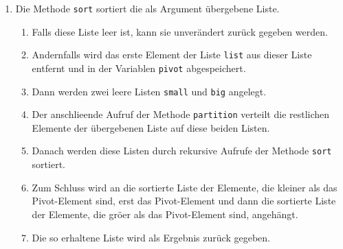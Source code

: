 \begin{enumerate}
      Falls die Listen \texttt{small} und \texttt{big} bei dem Aufruf nicht leer sind,
      so ist die Idee, dass die Elemente aus \texttt{list} entsprechend ihrer Gr\"o\3e
      den beiden Listen \texttt{small} und \texttt{big} hinzugef\"ugt werden.
      \begin{enumerate}
      \item Falls \texttt{list} leer ist, so gibt es keine Elemente, die verteilt werden
            m\"ussen.
      \item Andernfalls wird das erste Element von \texttt{list} aus \texttt{list}
            entfernt und, je nach dem wie gro\3 es im Vergleich zu dem Pivot-Element
            \texttt{pivot} ist, in die Liste \texttt{small} oder \texttt{big} eingef\"ugt.
      \item Schlie\3lich werden die restlichen Elemente von \texttt{list} durch einen
            rekursiven Aufruf der Funktion \texttt{partition} auf die Listen \texttt{small}
            und \texttt{big} verteilt.
      \end{enumerate}
\item Die Methode \texttt{sort} sortiert die als Argument \"ubergebene Liste. 
      \begin{enumerate}
      \item Falls diese Liste leer ist, kann sie unver\"andert zur\"uck gegeben werden.
      \item Andernfalls wird das erste Element der Liste \texttt{list} aus dieser Liste
            entfernt und in der Variablen \texttt{pivot}
            abgespeichert.
      \item Dann werden zwei leere Listen \texttt{small} und \texttt{big} angelegt.
      \item Der anschlie\3ende Aufruf der Methode \texttt{partition} verteilt die restlichen
            Elemente der \"ubergebenen Liste auf diese beiden Listen.
      \item Danach werden diese Listen durch rekursive Aufrufe der Methode
            \texttt{sort} sortiert.
      \item Zum Schluss wird an die sortierte Liste der Elemente, die kleiner als das
            Pivot-Element sind, erst das Pivot-Element und dann die sortierte Liste der Elemente,
            die gr\"o\3er als das Pivot-Element sind, angeh\"angt.
      \item Die so erhaltene Liste wird als Ergebnis zur\"uck gegeben.
      \end{enumerate}
\end{enumerate}

